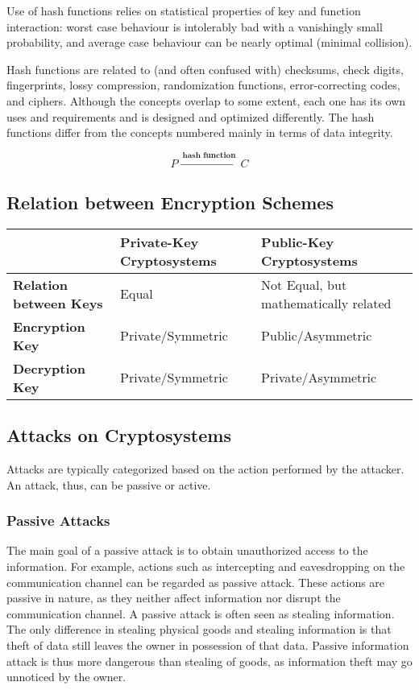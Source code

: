 \documentclass[british]{article}
\providecommand{\tabularnewline}{\\}
\providecommand{\tabularnewline}{\\}
\begin{document}
Use of hash functions relies on statistical properties of key and
function interaction: worst case behaviour is intolerably bad with
a vanishingly small probability, and average case behaviour can be
nearly optimal (minimal collision).

Hash functions are related to (and often confused with) checksums,
check digits, fingerprints, lossy compression, randomization functions,
error-correcting codes, and ciphers. Although the concepts overlap
to some extent, each one has its own uses and requirements and is
designed and optimized differently. The hash functions differ from
the concepts numbered mainly in terms of data integrity.

\[
	P\xrightarrow{\:\textbf{hash function}\:}C
\]


\subsection{Relation between Encryption Schemes}
\begin{center}
	\begin{tabular}{|l||l|l|}
		\hline
		                               & \textbf{Private-Key Cryptosystems} & \textbf{Public-Key Cryptosystems}\tabularnewline
		\hline
		\hline
		\textbf{Relation between Keys} & Equal                              & Not Equal, but mathematically related\tabularnewline
		\hline
		\textbf{Encryption Key}        & Private/Symmetric                  & Public/Asymmetric\tabularnewline
		\hline
		\textbf{Decryption Key}        & Private/Symmetric                  & Private/Asymmetric\tabularnewline
		\hline
	\end{tabular}
	\par\end{center}

\subsection{Attacks on Cryptosystems}

Attacks are typically categorized based on the action performed by
the attacker. An attack, thus, can be passive or active.

\subsubsection{Passive Attacks}

The main goal of a passive attack is to obtain unauthorized access
to the information. For example, actions such as intercepting and
eavesdropping on the communication channel can be regarded as passive
attack. These actions are passive in nature, as they neither affect
information nor disrupt the communication channel. A passive attack
is often seen as stealing information. The only difference in stealing
physical goods and stealing information is that theft of data still
leaves the owner in possession of that data. Passive information attack
is thus more dangerous than stealing of goods, as information theft
may go unnoticed by the owner.
\end{document}

